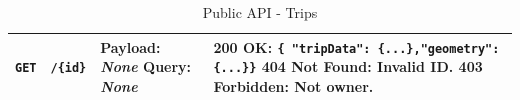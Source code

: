 \begin{table}[H]
\begin{tabularx}{\textwidth}{|l|p{2.5cm}|p{4cm}|X|}
    \texttt{GET} & \texttt{/\{id\}} & 
    \textbf{Payload:} \newline \textit{None} \newline \textbf{Query:} \newline \textit{None} & 
    \textbf{200 OK}:\newline 
    \texttt{\{ "tripData": \{...\},\newline "geometry": \{...\}\}} \newline
    \textbf{404 Not Found}: Invalid ID. \newline
    \textbf{403 Forbidden}: Not owner. \\ \hline
    \end{tabularx}
    \caption{Public API - Trips}
    \label{tab:api_public_trips}
\end{table}

